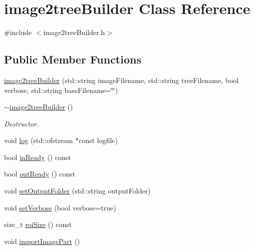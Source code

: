 \hypertarget{classimage2treeBuilder}{\section{image2tree\-Builder \-Class \-Reference}
\label{classimage2treeBuilder}
}


{\ttfamily \#include $<$image2tree\-Builder.\-h$>$}

\subsection*{\-Public \-Member \-Functions}
\begin{DoxyCompactItemize}
\item 
\hyperlink{classimage2treeBuilder_ab5d100bbecff8229b65d0eebd5eebbb9}{image2tree\-Builder} (std\-::string image\-Filename, std\-::string tree\-Filename, bool verbose, std\-::string base\-Filename=\char`\"{}\char`\"{})
\item 
\hypertarget{classimage2treeBuilder_a7c10057ecb35688a2b1f863c69880268}{\hyperlink{classimage2treeBuilder_a7c10057ecb35688a2b1f863c69880268}{$\sim$image2tree\-Builder} ()}\label{classimage2treeBuilder_a7c10057ecb35688a2b1f863c69880268}

\begin{DoxyCompactList}\small\item\em \-Destructor. \end{DoxyCompactList}\item 
void \hyperlink{classimage2treeBuilder_aec5a721192a8877235d8f812bc14233b}{log} (std\-::ofstream $\ast$const logfile)
\item 
bool \hyperlink{classimage2treeBuilder_a7fa10f2a07579de457e6ed72eb457d74}{in\-Ready} () const 
\item 
bool \hyperlink{classimage2treeBuilder_a6ed4d0d7e24ef0bd27420ed7e0f76f5b}{out\-Ready} () const 
\item 
void \hyperlink{classimage2treeBuilder_ab8ca31b7689f43d83cc99d5f5e4870a5}{set\-Output\-Folder} (std\-::string output\-Folder)
\item 
void \hyperlink{classimage2treeBuilder_ae220bed5b7258d043bfc71898a322a1a}{set\-Verbose} (bool verbose=true)
\item 
size\-\_\-t \hyperlink{classimage2treeBuilder_a25a05d644b6cc1a8c24a9ab79ddbcb39}{roi\-Size} () const 
\item 
void \hyperlink{classimage2treeBuilder_ad3d44dd5922373f15d7c8d2424490dc6}{import\-Image\-Part} ()
\end{DoxyCompactItemize}


